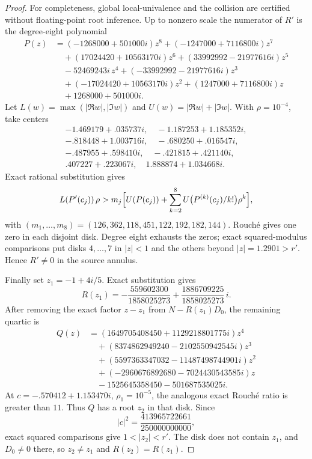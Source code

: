 \begin{proof}
For completeness, global local-univalence and the collision are certified without floating-point root inference. Up to nonzero scale the numerator of \(R'\) is the degree-eight polynomial
\begin{align*}
P(z)&=(-1268000+501000i)z^{8}+(-1247000+7116800i)z^{7}\\
&\quad+(17024420+10563170i)z^{6}+(33992992-21977616i)z^{5}\\
&\quad-52469243i\,z^{4}+(-33992992-21977616i)z^{3}\\
&\quad+(-17024420+10563170i)z^{2}+(1247000+7116800i)z\\
&\quad+1268000+501000i .
\end{align*}
Let \(L(w)=\max(|\Re w|,|\Im w|)\) and \(U(w)=|\Re w|+|\Im w|\). With \(\rho=10^{-4}\), take centers
\begin{gather*}
-1.469179+.035737i,\quad -1.187253+1.185352i,\\
-.818448+1.003716i,\quad -.680250+.016547i,\\
-.487955+.598410i,\quad -.421815+.421140i,\\
.407227+.223067i,\quad 1.888874+1.034668i .
\end{gather*}
Exact rational substitution gives
\[
L(P'(c_j))\,\rho>m_j\Bigl[U(P(c_j))+\sum_{k=2}^{8}U\bigl(P^{(k)}(c_j)/k!\bigr)\rho^{k}\Bigr],
\]
with \((m_1,\dots,m_8)=(126,362,118,451,122,192,182,144)\). Rouch\'e gives one zero in each disjoint disk. Degree eight exhausts the zeros; exact squared-modulus comparisons put disks \(4,\dots,7\) in \(|z|<1\) and the others beyond \(|z|=1.2901>r'\). Hence \(R'\neq 0\) in the source annulus.

Finally set \(z_1=-1+4i/5\). Exact substitution gives
\[
R(z_1)=-\frac{559602300}{1858025273}+\frac{1886709225}{1858025273}\,i .
\]
After removing the exact factor \(z-z_1\) from \(N-R(z_1)D_0\), the remaining quartic is
\begin{align*}
Q(z)&=(1649705408450+1129218801775i)z^{4}\\
&\quad+(8374862949240-2102550942545i)z^{3}\\
&\quad+(5597363347032-11487498744901i)z^{2}\\
&\quad+(-2960676892680-7024430543585i)z\\
&\quad-1525645358450-501687535025i .
\end{align*}
At \(c=-.570412+1.153470i\), \(\rho_1=10^{-5}\), the analogous exact Rouch\'e ratio is greater than \(11\). Thus \(Q\) has a root \(z_2\) in that disk. Since
\[
|c|^2=\frac{413965722661}{250000000000},
\]
exact squared comparisons give \(1<|z_2|<r'\). The disk does not contain \(z_1\), and \(D_0\neq 0\) there, so \(z_2\neq z_1\) and \(R(z_2)=R(z_1)\).
\end{proof}